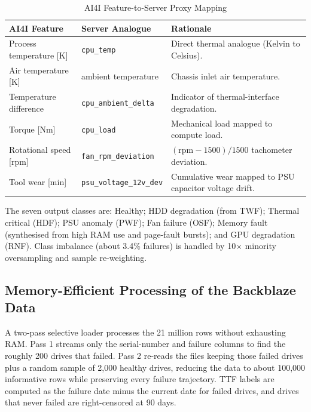 \documentclass[12pt,a4paper]{report}
\begin{document}
\begin{table}[h!]
  \centering
  \caption{AI4I Feature-to-Server Proxy Mapping}
  \label{tab:ai4imap}
  \vspace*{5pt}
  \footnotesize
  \renewcommand{\arraystretch}{1.4}
  \begin{tabular}{|p{3.4cm}|p{4.2cm}|p{5.6cm}|}
    \hline
    \textbf{AI4I Feature} & \textbf{Server Analogue} & \textbf{Rationale} \\ \hline
    Process temperature [K] & \texttt{cpu\_temp} & Direct thermal analogue (Kelvin to Celsius). \\ \hline
    Air temperature [K] & ambient temperature & Chassis inlet air temperature. \\ \hline
    Temperature difference & \texttt{cpu\_ambient\_delta} & Indicator of thermal-interface degradation. \\ \hline
    Torque [Nm] & \texttt{cpu\_load} & Mechanical load mapped to compute load. \\ \hline
    Rotational speed [rpm] & \texttt{fan\_rpm\_deviation} & $(\text{rpm}-1500)/1500$ tachometer deviation. \\ \hline
    Tool wear [min] & \texttt{psu\_voltage\_12v\_dev} & Cumulative wear mapped to PSU capacitor voltage drift. \\ \hline
  \end{tabular}
\end{table}

The seven output classes are: Healthy; HDD degradation (from TWF); Thermal critical (HDF); PSU anomaly (PWF); Fan failure (OSF); Memory fault (synthesised from high RAM use and page-fault bursts); and GPU degradation (RNF). Class imbalance (about 3.4\% failures) is handled by 10$\times$ minority oversampling and sample re-weighting.

\subsection{Memory-Efficient Processing of the Backblaze Data}
A two-pass selective loader processes the 21 million rows without exhausting RAM. Pass 1 streams only the serial-number and failure columns to find the roughly 200 drives that failed. Pass 2 re-reads the files keeping those failed drives plus a random sample of 2,000 healthy drives, reducing the data to about 100,000 informative rows while preserving every failure trajectory. TTF labels are computed as the failure date minus the current date for failed drives, and drives that never failed are right-censored at 90 days.
\end{document}
